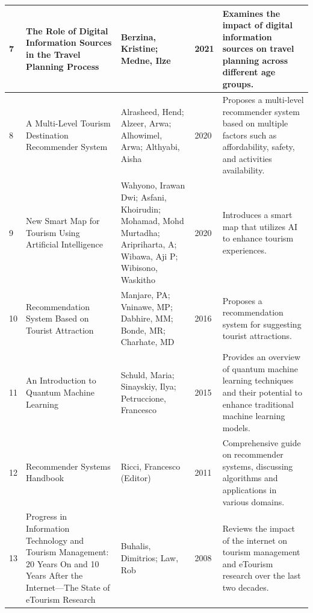\begin{longtable}{|p{0.5cm}|p{4cm}|p{4cm}|p{0.8cm}|p{5cm}|}
\hline
7 & The Role of Digital Information Sources in the Travel Planning Process & Berzina, Kristine; Medne, Ilze & 2021 & Examines the impact of digital information sources on travel planning across different age groups. \\
\hline
8 & A Multi-Level Tourism Destination Recommender System & Alrasheed, Hend; Alzeer, Arwa; Alhowimel, Arwa; Althyabi, Aisha & 2020 & Proposes a multi-level recommender system based on multiple factors such as affordability, safety, and activities availability. \\
\hline
9 & New Smart Map for Tourism Using Artificial Intelligence & Wahyono, Irawan Dwi; Asfani, Khoirudin; Mohamad, Mohd Murtadha; Aripriharta, A; Wibawa, Aji P; Wibisono, Waskitho & 2020 & Introduces a smart map that utilizes AI to enhance tourism experiences. \\
\hline
10 & Recommendation System Based on Tourist Attraction & Manjare, PA; Vninawe, MP; Dabhire, MM; Bonde, MR; Charhate, MD & 2016 & Proposes a recommendation system for suggesting tourist attractions. \\
\hline
11 & An Introduction to Quantum Machine Learning & Schuld, Maria; Sinayskiy, Ilya; Petruccione, Francesco & 2015 & Provides an overview of quantum machine learning techniques and their potential to enhance traditional machine learning models. \\
\hline
12 & Recommender Systems Handbook & Ricci, Francesco (Editor) & 2011 & Comprehensive guide on recommender systems, discussing algorithms and applications in various domains. \\
\hline
13 & Progress in Information Technology and Tourism Management: 20 Years On and 10 Years After the Internet—The State of eTourism Research & Buhalis, Dimitrios; Law, Rob & 2008 & Reviews the impact of the internet on tourism management and eTourism research over the last two decades. \\
\hline
\end{longtable}